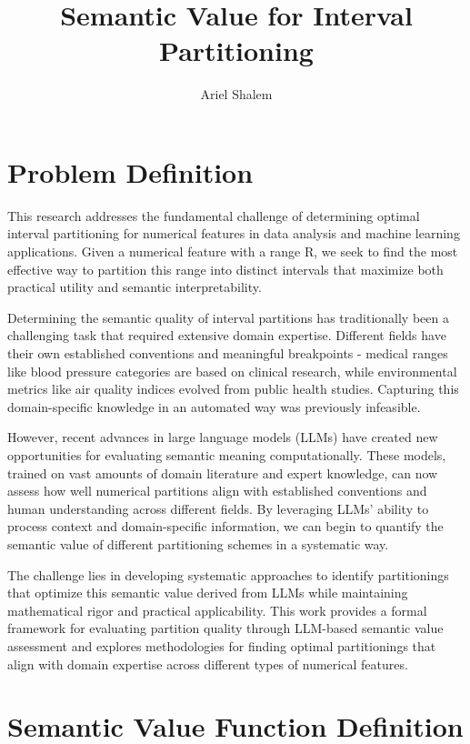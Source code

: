 \documentclass{article}
\begin{document}
\title{Semantic Value for Interval Partitioning}
\author{Ariel Shalem}
\maketitle

\section*{Problem Definition}

This research addresses the fundamental challenge of determining optimal interval partitioning for numerical features in data analysis and machine learning applications. Given a numerical feature with a range R, we seek to find the most effective way to partition this range into distinct intervals that maximize both practical utility and semantic interpretability.

Determining the semantic quality of interval partitions has traditionally been a challenging task that required extensive domain expertise. Different fields have their own established conventions and meaningful breakpoints - medical ranges like blood pressure categories are based on clinical research, while environmental metrics like air quality indices evolved from public health studies. Capturing this domain-specific knowledge in an automated way was previously infeasible.

However, recent advances in large language models (LLMs) have created new opportunities for evaluating semantic meaning computationally. These models, trained on vast amounts of domain literature and expert knowledge, can now assess how well numerical partitions align with established conventions and human understanding across different fields. By leveraging LLMs' ability to process context and domain-specific information, we can begin to quantify the semantic value of different partitioning schemes in a systematic way.

The challenge lies in developing systematic approaches to identify partitionings that optimize this semantic value derived from LLMs while maintaining mathematical rigor and practical applicability. This work provides a formal framework for evaluating partition quality through LLM-based semantic value assessment and explores methodologies for finding optimal partitionings that align with domain expertise across different types of numerical features.



\section*{Semantic Value Function Definition}
\end{document}
